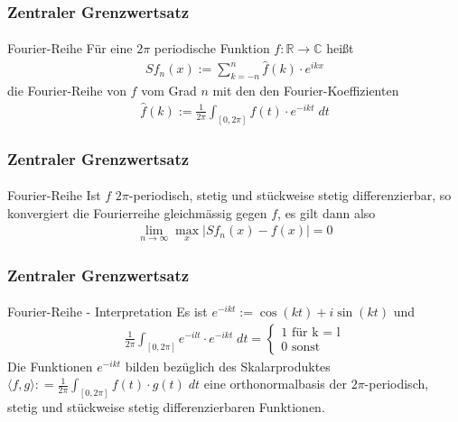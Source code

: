 \documentclass{beamer}
\begin{document}
\begin{frame}
    \frametitle{Zentraler Grenzwertsatz}
\framesubtitle{}

\begin{block}{Fourier-Reihe}
Für eine $2\pi$ periodische Funktion $f: \mathbb{R} \to \mathbb{C}$  heißt 
\begin{align*}
Sf_n(x) := \sum_{k= -n}^{n} \hat{f}(k) \cdot e^{ikx} 
\end{align*}
die Fourier-Reihe von $f$ vom Grad $n$ mit den den Fourier-Koeffizienten
\begin{align*}
\hat{f}(k) := \frac{1}{2 \pi} \int_{[0, 2 \pi]} f(t) \cdot e^{-ikt} \; dt
\end{align*}
\end{block}

 \end{frame}


\begin{frame}
    \frametitle{Zentraler Grenzwertsatz}
\framesubtitle{}

\begin{block}{Fourier-Reihe}
Ist $f$  $2\pi$-periodisch,  stetig und stückweise stetig differenzierbar, so konvergiert die Fourierreihe gleichmässig gegen $f$, es gilt dann also 
\begin{align*}
\lim_{n \to \infty} \max_x |Sf_n(x) -f(x) | = 0
\end{align*}
\end{block}

 \end{frame}



\begin{frame}
    \frametitle{Zentraler Grenzwertsatz}
\framesubtitle{}

\begin{block}{Fourier-Reihe - Interpretation}
Es ist $e^{-ikt} := \cos (k t) + i \sin(kt)$ und 
\begin{align*}
  \frac{1}{2 \pi}  \int_{[0, 2 \pi]}  e^{-ilt} \cdot e^{-ikt} \; dt = \begin{cases} 1 \text{ für k = l}  \\ 0 \text{ sonst }\end{cases}
\end{align*}
Die Funktionen  $e^{-ikt}$ bilden bezüglich des Skalarproduktes $\langle f, g \rangle : =\frac{1}{2 \pi}  \int_{[0, 2 \pi]}  f(t) \cdot g(t) \; dt$ eine orthonormalbasis der $2\pi$-periodisch, stetig und stückweise stetig differenzierbaren Funktionen.
\end{block}
 \end{frame}
\end{document}
